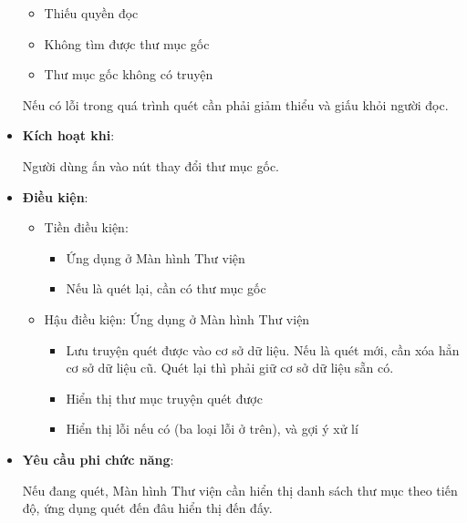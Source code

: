\documentclass[../../thesis]{subfiles}
\begin{document}
\begin{itemize}
        \begin{itemize}
            \item
                Thiếu quyền đọc
            \item
                Không tìm được thư mục gốc
            \item
                Thư mục gốc không có truyện
        \end{itemize}

        Nếu có lỗi trong quá trình quét cần phải giảm thiểu và giấu khỏi người
        đọc.
    \item
        \textbf{Kích hoạt khi}:

        Người dùng ấn vào nút thay đổi thư mục gốc.
    \item
        \textbf{Điều kiện}:

        \begin{itemize}
            \item
                Tiền điều kiện:

                \begin{itemize}
                    \item Ứng dụng ở Màn hình Thư viện
                    \item Nếu là quét lại, cần có thư mục gốc
                \end{itemize}
            \item
                Hậu điều kiện: Ứng dụng ở Màn hình Thư viện

                \begin{itemize}
                    \item
                        Lưu truyện quét được vào cơ sở dữ liệu. Nếu là quét mới,
                        cần xóa hẳn cơ sở dữ liệu cũ. Quét lại thì phải giữ cơ
                        sở dữ liệu sẵn có.
                    \item
                        Hiển thị thư mục truyện quét được
                    \item
                        Hiển thị lỗi nếu có (ba loại lỗi ở trên), và gợi ý xử lí
                \end{itemize}
          \end{itemize}
    \item
        \textbf{Yêu cầu phi chức năng}:

        Nếu đang quét, Màn hình Thư viện cần hiển thị danh sách thư mục theo
        tiến độ, ứng dụng quét đến đâu hiển thị đến đấy.
\end{itemize}
\end{document}
